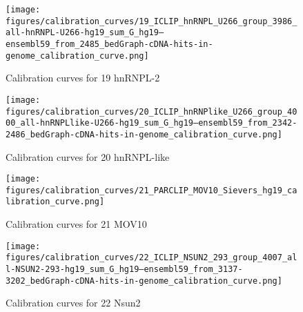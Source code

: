 \documentclass[11pt]{article}
\begin{document}
    
    
    \begin{figure}
        \begin{center}
            \texttt{[image: figures/calibration\_curves/19\_ICLIP\_hnRNPL\_U266\_group\_3986\_all-hnRNPL-U266-hg19\_sum\_G\_hg19--ensembl59\_from\_2485\_bedGraph-cDNA-hits-in-genome\_calibration\_curve.png]}
            \caption{Calibration curves for 19 hnRNPL-2}
            \label{fig:calibration19 hnRNPL-2}
        \end{center}
    \end{figure}

    
    
    \begin{figure}
        \begin{center}
            \texttt{[image: figures/calibration\_curves/20\_ICLIP\_hnRNPlike\_U266\_group\_4000\_all-hnRNPLlike-U266-hg19\_sum\_G\_hg19--ensembl59\_from\_2342-2486\_bedGraph-cDNA-hits-in-genome\_calibration\_curve.png]}
            \caption{Calibration curves for 20 hnRNPL-like}
            \label{fig:calibration20 hnRNPL-like}
        \end{center}
    \end{figure}

    
    
    \begin{figure}
        \begin{center}
            \texttt{[image: figures/calibration\_curves/21\_PARCLIP\_MOV10\_Sievers\_hg19\_calibration\_curve.png]}
            \caption{Calibration curves for 21 MOV10}
            \label{fig:calibration21 MOV10}
        \end{center}
    \end{figure}

    
    
    \begin{figure}
        \begin{center}
            \texttt{[image: figures/calibration\_curves/22\_ICLIP\_NSUN2\_293\_group\_4007\_all-NSUN2-293-hg19\_sum\_G\_hg19--ensembl59\_from\_3137-3202\_bedGraph-cDNA-hits-in-genome\_calibration\_curve.png]}
            \caption{Calibration curves for 22 Nsun2}
            \label{fig:calibration22 Nsun2}
        \end{center}
    \end{figure}
\end{document}

